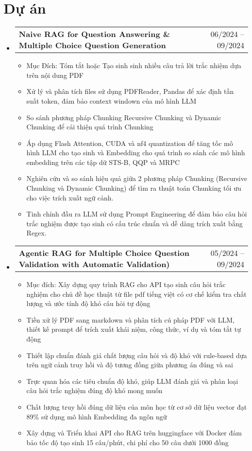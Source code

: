 \documentclass[letterpaper,11pt]{article}
\makeatletter
\newcommand{\resumeItem}[1]{
	\item\small{
	{#1 \vspace{-2pt}}
	}
}
\newcommand{\resumeProjectHeading}[2]{
	\item
	\begin{tabular*}{0.97\textwidth}{l@{\extracolsep{\fill}}r}
		\small#1 & #2 \\
	\end{tabular*}\vspace{-7pt}
}
\newcommand{\resumeSubHeadingListStart}{\begin{itemize}[leftmargin=0.15in, label={}]}
\newcommand{\resumeSubHeadingListEnd}{\end{itemize}}
\newcommand{\resumeItemListStart}{\begin{itemize}}
\newcommand{\resumeItemListEnd}{\end{itemize}\vspace{-5pt}}
\makeatother
\begin{document}
\section{Dự án}
	\resumeSubHeadingListStart
		\resumeProjectHeading %
			{\textbf{Naive RAG for Question Answering \& Multiple Choice Question Generation}}{06/2024 -- 09/2024}
			\resumeItemListStart
			\resumeItem{Mục Đích: Tóm tắt hoặc Tạo sinh sinh nhiều câu trả lời trắc nhiệm dựa trên nội dung PDF}
			\resumeItem{Xử lý và phân tích files sử dụng PDFReader, Pandas để xác định tần suất token, đảm bảo context windown của mô hình LLM}
			\resumeItem{So sánh phương pháp Chunking Recursive Chunking và Dynamic Chunking để cải thiện quá trình Chunking}
			\resumeItem{Áp dụng Flash Attention, CUDA và nf4 quantization để tăng tốc mô hình LLM cho tạo sinh và Embedding cho quá trình so sánh các mô hình embedding trên các tập dữ STS-B, QQP và MRPC}
			\resumeItem{Nghiên cứu và so sánh hiệu quả giữa 2 phương pháp Chunking (Recursive Chunking và Dynamic Chunking) để tìm ra thuật toán Chunking tối ưu cho việc trích xuất ngữ cảnh.}
			\resumeItem{Tinh chỉnh đầu ra LLM sử dụng Prompt Engineering để đảm bảo câu hỏi trắc nghiệm được tạo sinh có cấu trúc chuẩn và dễ dàng trích xuất bằng Regex.}
			\resumeItemListEnd

		\resumeProjectHeading
		        {\textbf{Agentic RAG for Multiple Choice Question Validation with Automatic Validation)}}{05/2024 -- 09/2024}
	            	 \resumeItemListStart
		            \resumeItem{Mục đích: Xây dựng quy trình RAG cho API tạo sinh câu hỏi trắc nghiệm cho chủ đề học thuật từ file pdf tiếng việt có cơ chế kiểm tra chất lượng và ước tính độ khó câu hỏi tự động}
 		            \resumeItem{Tiền xử lý PDF sang markdown và phân tích cú pháp PDF với LLM, thiết kế prompt để trích xuất khái niệm, công thức, ví dụ và tóm tắt tự động}
			  \resumeItem{Thiết lập chuẩn đánh giá chất lượng câu hỏi và độ khó với rule-based dựa trên ngữ cảnh truy hồi và độ tương đồng giữa phương án đúng và sai}
 		            \resumeItem{Trực quan hóa các tiêu chuẩn độ khó, giúp LLM đánh giá và phân loại câu hỏi trắc nghiệm đúng độ khó mong muốn}
 		            \resumeItem{Chất lượng truy hồi đúng dữ liệu của môn học từ cơ sở dữ liệu vector đạt 89\% sử dụng mô hình Embedding đa ngôn ngữ}
		            \resumeItem{Xây dựng và Triển khai API cho RAG trên huggingface với Docker đảm bảo tốc độ tạo sinh 15 câu/phút, chi phí cho 50 câu dưới 1000 đồng}
	\resumeItemListEnd
	\resumeSubHeadingListEnd
\end{document}
